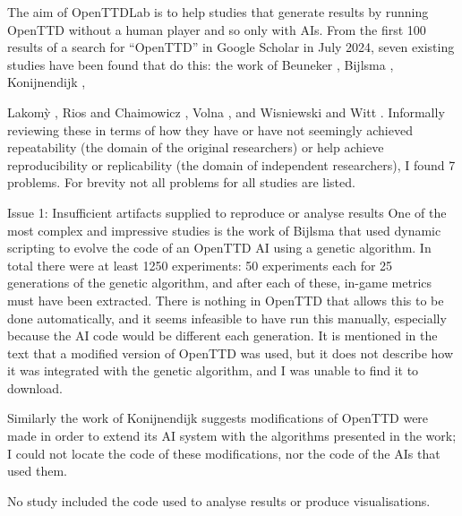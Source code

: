 \documentclass[logo,msc,dsti]{style/infthesis}    %
\begin{document}
The aim of OpenTTDLab is to help studies that generate results by running OpenTTD without a human player and so only with AIs. From the first 100 results of a search for ``OpenTTD'' in Google Scholar in July 2024, seven existing studies have been found that do this: the work of Beuneker \cite{beuneker2019autonomous}, Bijlsma \cite{bijlsma2014evolving}, Konijnendijk \cite{konijnendijk2015mcts}, {Lakom{\`y} \cite{lakomy2020railroad}, Rios and Chaimowicz \cite{rios2009trains}, Volna \cite{volna2017fuzzy}, and Wisniewski and Witt \cite{wisniewski2011artificial}. Informally reviewing these in terms of how they have or have not seemingly achieved repeatability (the domain of the original researchers) or help achieve reproducibility or replicability (the domain of independent researchers), I found 7 problems. For brevity not all problems for all studies are listed.

\begin{itemize}

\begin{descitem}{Issue 1: Insufficient artifacts supplied to reproduce or analyse results}
One of the most complex and impressive studies is the work of Bijlsma \cite{bijlsma2014evolving} that used dynamic scripting to evolve the code of an OpenTTD AI using a genetic algorithm. In total there were at least 1250 experiments: 50 experiments each for 25 generations of the genetic algorithm, and after each of these, in-game metrics must have been extracted. There is nothing in OpenTTD that allows this to be done automatically, and it seems infeasible to have run this manually, especially because the AI code would be different each generation. It is mentioned in the text that a modified version of OpenTTD was used, but it does not describe how it was integrated with the genetic algorithm, and I was unable to find it to download.

Similarly the work of Konijnendijk \cite{konijnendijk2015mcts} suggests modifications of OpenTTD were made in order to extend its AI system with the algorithms presented in the work; I could not locate the code of these modifications, nor the code of the AIs that used them.

No study included the code used to analyse results or produce visualisations.
\end{descitem}


\end{itemize}}
\end{document}
